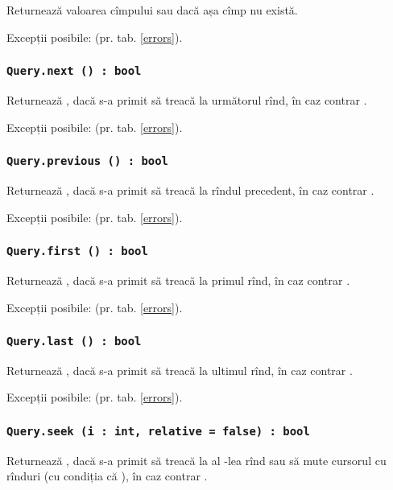 Returnează valoarea cîmpului  sau \void{} dacă așa cîmp nu există.

Excepții posibile:  (pr. tab. \ref{errors}).

\subsubsection{\lstinline|Query.next () : bool|}

Returnează \true, dacă s-a primit să treacă la următorul rînd, în caz contrar \false.

Excepții posibile:  (pr. tab. \ref{errors}).

\subsubsection{\lstinline|Query.previous () : bool|}

Returnează \true, dacă s-a primit să treacă la rîndul precedent, în caz contrar \false.

Excepții posibile:  (pr. tab. \ref{errors}).

\subsubsection{\lstinline|Query.first () : bool|}

Returnează \true, dacă s-a primit să treacă la primul rînd, în caz contrar \false.

Excepții posibile:  (pr. tab. \ref{errors}).

\subsubsection{\lstinline|Query.last () : bool|}

Returnează \true, dacă s-a primit să treacă la ultimul rînd, în caz contrar \false.

Excepții posibile:  (pr. tab. \ref{errors}).

\subsubsection{\lstinline|Query.seek (i : int, relative = false) : bool|}

Returnează \true, dacă s-a primit să treacă la al -lea rînd sau să mute cursorul cu  rînduri (cu condiția că ), în caz contrar \false.

